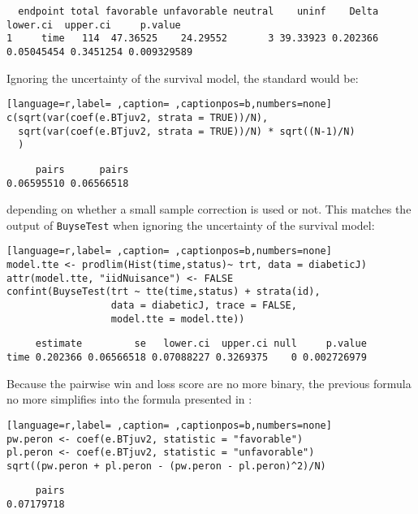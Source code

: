 \documentclass[12pt]{article}
\newcommand\Warning[1][3ex]{%
\renewcommand\stacktype{L}%
\scaleto{\stackon[1.3pt]{\color{red}$\triangle$}{\tiny\bfseries !}}{#1}%
\xspace
}
\begin{document}
\begin{verbatim}
  endpoint total favorable unfavorable neutral    uninf    Delta   lower.ci  upper.ci     p.value
1     time   114  47.36525    24.29552       3 39.33923 0.202366 0.05045454 0.3451254 0.009329589
\end{verbatim}


Ignoring the uncertainty of the survival model, the standard would be:
\begin{lstlisting}[language=r,label= ,caption= ,captionpos=b,numbers=none]
c(sqrt(var(coef(e.BTjuv2, strata = TRUE))/N),
  sqrt(var(coef(e.BTjuv2, strata = TRUE))/N) * sqrt((N-1)/N)
  )
\end{lstlisting}

\begin{verbatim}
     pairs      pairs 
0.06595510 0.06566518
\end{verbatim}


depending on whether a small sample correction is used or not. This
matches the output of \texttt{BuyseTest} when ignoring the uncertainty of the
survival model:
\begin{lstlisting}[language=r,label= ,caption= ,captionpos=b,numbers=none]
model.tte <- prodlim(Hist(time,status)~ trt, data = diabeticJ)
attr(model.tte, "iidNuisance") <- FALSE
confint(BuyseTest(trt ~ tte(time,status) + strata(id), 
                  data = diabeticJ, trace = FALSE,
                  model.tte = model.tte))
\end{lstlisting}

\begin{verbatim}
     estimate         se   lower.ci  upper.ci null     p.value
time 0.202366 0.06566518 0.07088227 0.3269375    0 0.002726979
\end{verbatim}


\Warning Because the pairwise win and loss score are no more binary, the
previous formula no more simplifies into the formula presented in
\cite{matsouaka2022robust}:
\begin{lstlisting}[language=r,label= ,caption= ,captionpos=b,numbers=none]
pw.peron <- coef(e.BTjuv2, statistic = "favorable")
pl.peron <- coef(e.BTjuv2, statistic = "unfavorable")
sqrt((pw.peron + pl.peron - (pw.peron - pl.peron)^2)/N)
\end{lstlisting}

\begin{verbatim}
     pairs 
0.07179718
\end{verbatim}


\clearpage 
\end{document}
